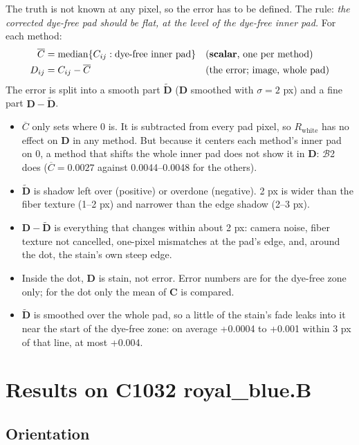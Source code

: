 \documentclass[11pt,letterpaper]{article}
\newcommand{\SCALAR}{\textbf{scalar}}
\newcommand{\mC}{\mathbf{C}}   %
\newcommand{\mD}{\mathbf{D}}   %
\newcommand{\tD}{\widetilde{\mathbf{D}}}
\newcommand{\Rwhite}{R_{\text{white}}}
\newcommand{\Cbar}{\overline{C}}
\newcommand{\MB}{\mathcal{B}}
\begin{document}
The truth is not known at any pixel, so the error has to be defined.  The
rule: \emph{the corrected dye-free pad should be flat, at the level of the
dye-free inner pad.}  For each method:
\begin{align}
  \Cbar &= \operatorname{median}\{C_{ij} : \text{dye-free inner pad}\}
    && \text{(\SCALAR, one per method)} \\
  D_{ij} &= C_{ij} - \Cbar && \text{(the error; image, whole pad)}
\end{align}
The error is split into a smooth part $\tD$ ($\mD$ smoothed with
$\sigma = 2$ px) and a fine part $\mD - \tD$.
\begin{itemize}
  \item $\Cbar$ only sets where 0 is.  It is subtracted from every pad
    pixel, so $\Rwhite$ has no effect on $\mD$ in any method.  But because it
    centers each method's inner pad on 0, a method that shifts the whole
    inner pad does not show it in $\mD$: $\MB$2 does ($\Cbar = 0.0027$
    against 0.0044--0.0048 for the others).
  \item $\tD$ is shadow left over (positive) or overdone (negative).  2 px
    is wider than the fiber texture (1--2 px) and narrower than the edge
    shadow (2--3 px).
  \item $\mD - \tD$ is everything that changes within about 2 px: camera
    noise, fiber texture not cancelled, one-pixel mismatches at the pad's
    edge, and, around the dot, the stain's own steep edge.
  \item Inside the dot, $\mD$ is stain, not error.  Error numbers are for
    the dye-free zone only; for the dot only the mean of $\mC$ is compared.
  \item $\tD$ is smoothed over the whole pad, so a little of the stain's
    fade leaks into it near the start of the dye-free zone: on average
    +0.0004 to +0.001 within 3 px of that line, at most +0.004.
\end{itemize}

\section{Results on C1032 royal\_blue.B}
\label{sec:results}

\subsection{Orientation}
\end{document}
